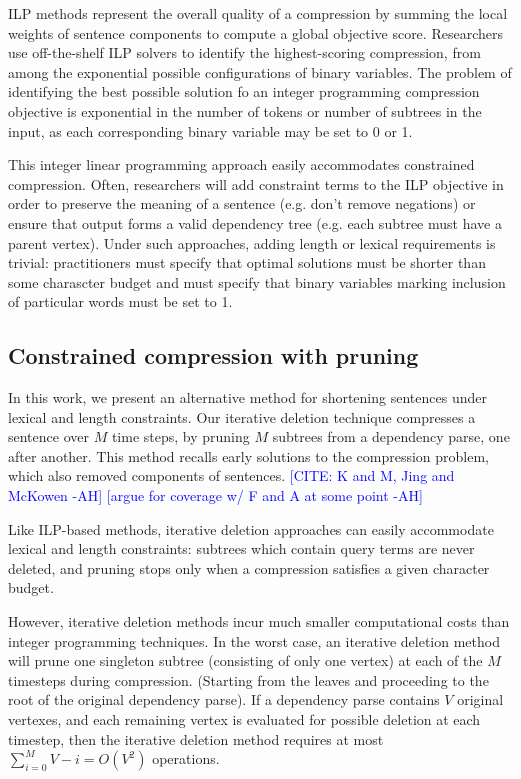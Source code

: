 \documentclass[11pt,a4paper]{article}
\newcommand{\ahcomment}[1]{\textcolor{blue}{[#1 -AH]}}
\begin{document}
ILP methods represent the overall quality of a compression by summing the local weights of sentence components to compute a global objective score. Researchers use off-the-shelf ILP solvers to identify the highest-scoring compression, from among the exponential possible configurations of binary variables. The problem of identifying the best possible solution fo an integer programming compression objective is exponential in the number of tokens or number of subtrees in the input, as each corresponding binary variable may be set to 0 or 1.

This integer linear programming approach easily accommodates constrained compression. Often, researchers will add constraint terms to the ILP objective in order to preserve the meaning of a sentence (e.g. don't remove negations) or ensure that output forms a valid dependency tree (e.g. each subtree must have a parent vertex). Under such approaches, adding length or lexical requirements is trivial: practitioners must specify that optimal solutions must be shorter than some charascter budget and must specify that binary variables marking inclusion of particular words must be set to 1. 

\subsection{Constrained compression with pruning}

In this work, we present an alternative method for shortening sentences under lexical and length constraints. Our iterative deletion technique compresses a sentence over $M$ time steps, by pruning $M$ subtrees from a dependency parse, one after another. This method recalls early solutions to the compression problem, which also removed components of sentences. \ahcomment{CITE: K and M, Jing  and McKowen} \ahcomment{argue for coverage w/ F and A at some point}

Like ILP-based methods, iterative deletion approaches can easily accommodate lexical and length constraints: subtrees which contain query terms are never deleted, and pruning stops only when a compression satisfies a given character budget. 

However, iterative deletion methods incur much smaller computational costs than integer programming techniques. In the worst case, an iterative deletion method will prune one singleton subtree (consisting of only one vertex) at each of the $M$ timesteps during compression. (Starting from the leaves and proceeding to the root of the original dependency parse). If a dependency parse contains $V$ original vertexes, and each remaining vertex is evaluated for possible deletion at each timestep, then the iterative deletion method requires at most ${\sum_{i = 0}^M V - i = O(V^2)}$ operations.
\end{document}
